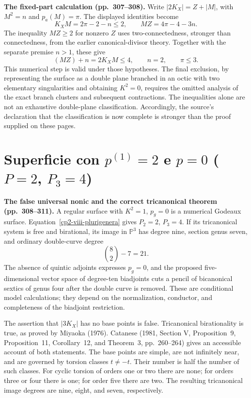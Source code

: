 \textbf{The fixed-part calculation (pp.~307--308).}
Write \(|2K_X|=Z+|M|\), with \(M^2=n\) and \(p_a(M)=\pi\). The displayed identities become
\[
K_XM=2\pi-2-n\leq2,\qquad
MZ=4\pi-4-3n.
\]
The inequality \(MZ\geq2\) for nonzero \(Z\) uses two-connectedness, stronger than connectedness, from the earlier canonical-divisor theory. Together with the separate premise \(n>1\), these give
\[
(MZ)+n=2K_XM\leq4,\qquad n=2,\qquad \pi\leq3.
\]
This numerical step is valid under those hypotheses. The final exclusion, by representing the surface as a double plane branched in an octic with two elementary singularities and obtaining \(K^2=0\), requires the omitted analysis of the exact branch clusters and subsequent contractions. The inequalities alone are not an exhaustive double-plane classification. Accordingly, the source's declaration that the classification is now complete is stronger than the proof supplied on these pages.

\section{Superficie con \texorpdfstring{$p^{(1)}=2$}{p(1)=2} e \texorpdfstring{$p=0$}{p=0} (\texorpdfstring{$P=2$}{P=2}, \texorpdfstring{$P_3=4$}{P3=4})}
\label{cp2-viii-16}

\textbf{The false universal nonic and the correct tricanonical theorem (pp.~308--311).}
A regular surface with \(K^2=1\), \(p_g=0\) is a numerical Godeaux surface. Equation~\eqref{cp2-viii-plurigenera} gives \(P_2=2\), \(P_3=4\). If its tricanonical system is free and birational, its image in \(\mathbb P^3\) has degree nine, section genus seven, and ordinary double-curve degree
\[
\binom{8}{2}-7=21.
\]
The absence of quintic adjoints expresses \(p_g=0\), and the proposed five-dimensional vector space of degree-ten biadjoints cuts a pencil of bicanonical sextics of genus four after the double curve is removed. These are conditional model calculations; they depend on the normalization, conductor, and completeness of the biadjoint restriction.

The assertion that \(|3K_X|\) has no base points is false. Tricanonical birationality is true, as proved by Miyaoka (1976). Catanese (1981, Section V, Proposition~9, Proposition~11, Corollary~12, and Theorem~3, pp.~260--264) gives an accessible account of both statements. The base points are simple, are not infinitely near, and are governed by torsion classes \(t\ne-t\). Their number is half the number of such classes. For cyclic torsion of orders one or two there are none; for orders three or four there is one; for order five there are two. The resulting tricanonical image degrees are nine, eight, and seven, respectively.


